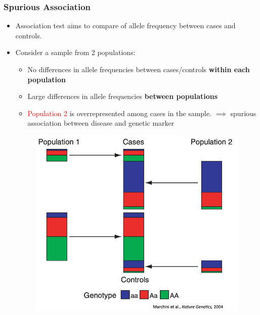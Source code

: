 \documentclass{beamer}
\begin{document}
\begin{frame}
	\frametitle{Spurious Association}
	\begin{itemize}
		\item  Association test aims to compare of allele frequency between cases and controls.
		\item Consider a sample from 2 populations:  
\begin{minipage}{.55\textwidth}
	\begin{itemize}
		\item No differences in allele frequencies between cases/controls \textbf{within each population}
		\item Large differences in allele frequencies \textbf{between  populations}
		\item \textcolor{red}{Population 2} is overrepresented among cases in the sample.
		\newline $\implies$ spurious association between disease and genetic marker 
	\end{itemize}
\end{minipage}%
\begin{minipage}{.5\textwidth}
\begin{figure}
	\includegraphics[scale=.25]{Figures/spurious_cc}
\end{figure}
\end{minipage}

		\end{itemize}
\end{frame}
\end{document}

